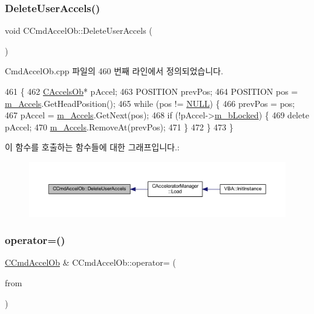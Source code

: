 \subsubsection{\texorpdfstring{Delete\+User\+Accels()}{DeleteUserAccels()}}
{\footnotesize\ttfamily void C\+Cmd\+Accel\+Ob\+::\+Delete\+User\+Accels (\begin{DoxyParamCaption}{ }\end{DoxyParamCaption})}



Cmd\+Accel\+Ob.\+cpp 파일의 460 번째 라인에서 정의되었습니다.


\begin{DoxyCode}
461 \{
462   \mbox{\hyperlink{class_c_accels_ob}{CAccelsOb}}* pAccel;
463   POSITION prevPos;
464   POSITION pos = \mbox{\hyperlink{class_c_cmd_accel_ob_a85772f1ea9204af42b8a39a0135dc0f8}{m\_Accels}}.GetHeadPosition();
465   \textcolor{keywordflow}{while} (pos != \mbox{\hyperlink{getopt1_8c_a070d2ce7b6bb7e5c05602aa8c308d0c4}{NULL}}) \{
466     prevPos = pos;
467     pAccel = \mbox{\hyperlink{class_c_cmd_accel_ob_a85772f1ea9204af42b8a39a0135dc0f8}{m\_Accels}}.GetNext(pos);
468     \textcolor{keywordflow}{if} (!pAccel->\mbox{\hyperlink{class_c_accels_ob_ad8300bd20bd429ad61f89700e388dd9a}{m\_bLocked}}) \{
469       \textcolor{keyword}{delete} pAccel;
470       \mbox{\hyperlink{class_c_cmd_accel_ob_a85772f1ea9204af42b8a39a0135dc0f8}{m\_Accels}}.RemoveAt(prevPos);
471     \}
472   \}
473 \}
\end{DoxyCode}
이 함수를 호출하는 함수들에 대한 그래프입니다.\+:
\nopagebreak
\begin{figure}[H]
\begin{center}
\leavevmode
\includegraphics[width=350pt]{class_c_cmd_accel_ob_a7040471adc76f057a1d79c9fdfb84fe8_icgraph}
\end{center}
\end{figure}
\mbox{\label{class_c_cmd_accel_ob_a045ce00d2465fefed857066eef1406a7}} 
\subsubsection{\texorpdfstring{operator=()}{operator=()}}
{\footnotesize\ttfamily \mbox{\hyperlink{class_c_cmd_accel_ob}{C\+Cmd\+Accel\+Ob}} \& C\+Cmd\+Accel\+Ob\+::operator= (\begin{DoxyParamCaption}\item[{\mbox{\hyperlink{getopt1_8c_a2c212835823e3c54a8ab6d95c652660e}{const}} \mbox{\hyperlink{class_c_cmd_accel_ob}{C\+Cmd\+Accel\+Ob}} \&}]{from }\end{DoxyParamCaption})}



